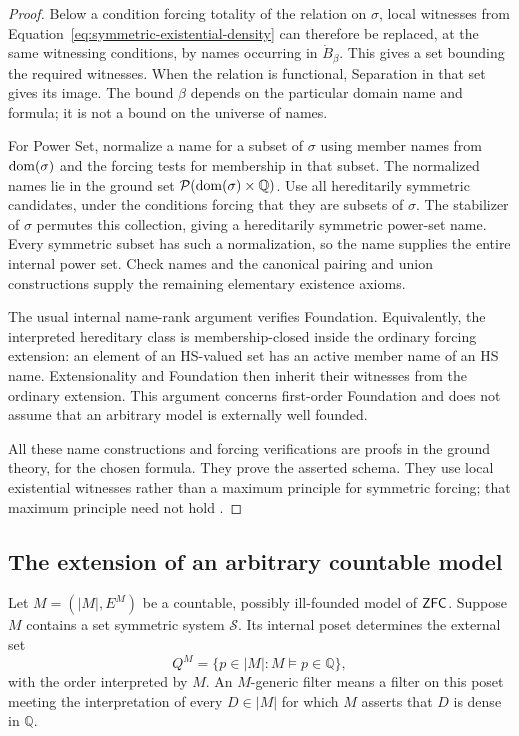 \begin{proof}
Below a condition forcing totality of the relation on $\sigma$,
local witnesses from
Equation~\eqref{eq:symmetric-existential-density} can therefore
be replaced, at the same witnessing conditions, by names occurring
in $\dot B_\beta$. This gives a set bounding the required
witnesses. When the relation is functional, Separation in that
set gives its image. The bound $\beta$ depends on the particular
domain name and formula; it is not a bound on the universe of
names.

For Power Set, normalize a name for a subset of $\sigma$ using
member names from $\operatorname{dom}(\sigma)$ and the forcing tests for
membership in that subset. The normalized names lie in the
ground set $\mathcal P(\operatorname{dom}(\sigma)\times\mathbb Q)$.
Use all hereditarily symmetric candidates, under the conditions
forcing that they are subsets of $\sigma$. The stabilizer of
$\sigma$ permutes this collection, giving a hereditarily
symmetric power-set name. Every symmetric subset has such a
normalization, so the name supplies the entire internal power set.
Check names and the canonical pairing and union constructions
supply the remaining elementary existence axioms.

The usual internal name-rank argument verifies Foundation.
Equivalently, the interpreted hereditary class is membership-closed
inside the ordinary forcing extension: an element of an
HS-valued set has an active member name of an HS name.
Extensionality and Foundation then inherit their witnesses from
the ordinary extension. This argument concerns first-order
Foundation and does not assume that an arbitrary model is
externally well founded.

All these name constructions and forcing verifications are proofs
in the ground theory, for the chosen formula. They prove the
asserted schema. They use local existential witnesses rather
than a maximum principle for symmetric forcing; that maximum
principle need not hold
\cite[Proposition~10.26]{KaragilaNotes2026}.
\end{proof}

\subsection{The extension of an arbitrary countable model}

Let $M=(|M|,E^M)$ be a countable, possibly ill-founded model of
$\mathsf{ZFC}$. Suppose $M$ contains a set symmetric system
$\mathcal S$. Its internal poset determines the external set
\[
 Q^M=\{p\in|M|:M\models p\in\mathbb Q\},
\]
with the order interpreted by $M$. An $M$-generic filter means
a filter on this poset meeting the interpretation of every
$D\in|M|$ for which $M$ asserts that $D$ is dense in
$\mathbb Q$.

